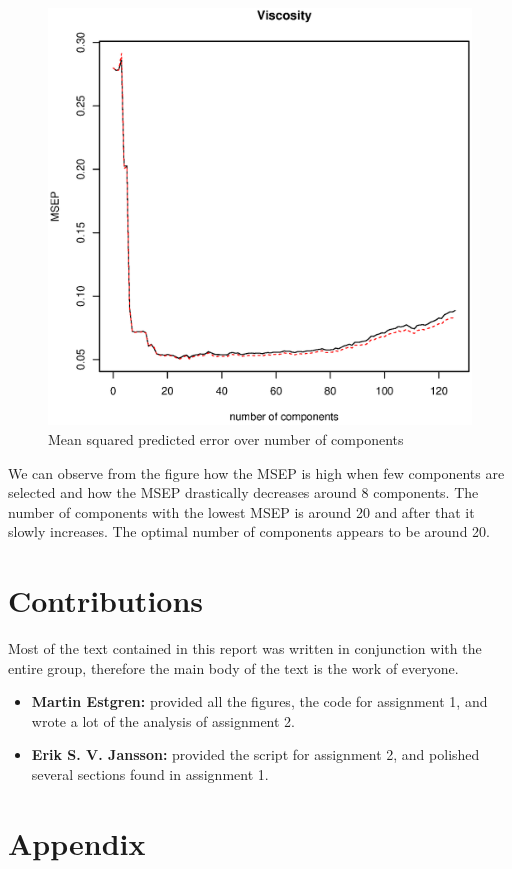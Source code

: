 \documentclass[a4paper,12pt]{article}
\begin{document}
        \begin{figure}[H]
            \centering
            \caption{Mean squared predicted error over number of components}
            \label{fig:viscosity}
            \includegraphics[width=\textwidth]{share/A2_viscosity.eps}
        \end{figure}

	We can observe from the figure how the MSEP is high when few components are selected and how the MSEP drastically decreases around 8 components. The number of components with the lowest MSEP is around 20 and after that it slowly increases. The optimal number of components appears to be around 20. 
	
    \section*{Contributions}
        Most of the text contained in this report was written in conjunction with the entire group, therefore the main body of the text is the work of everyone.
    \begin{itemize}
        \item{\textbf{Martin Estgren:} provided all the figures, the code for assignment 1, and wrote a lot of the analysis of assignment 2.}
        \item{\textbf{Erik S. V. Jansson:} provided the script for assignment 2, and polished several sections found in assignment 1.}
    \end{itemize}
    \nocite{*} %
    
    
    \onecolumn \appendix
    \section*{Appendix}

    
    
\end{document}
